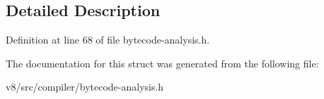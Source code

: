 \subsection{Detailed Description}


Definition at line 68 of file bytecode-\/analysis.\+h.



The documentation for this struct was generated from the following file\+:\begin{DoxyCompactItemize}
\item 
v8/src/compiler/bytecode-\/analysis.\+h\end{DoxyCompactItemize}
